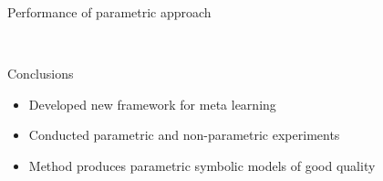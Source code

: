 \documentclass{beamer}
\begin{document}
\begin{frame}{Performance of parametric approach}
\begin{figure}[!ht]
	\centering
	\quad
	\\
	\quad
\end{figure}
\end{frame}

\begin{frame}{Conclusions}
	\begin{itemize}
		\item Developed new framework for meta learning
		\item Conducted parametric and non-parametric experiments
		\item Method produces parametric symbolic models of good quality
	\end{itemize}
\end{frame}
\end{document}
